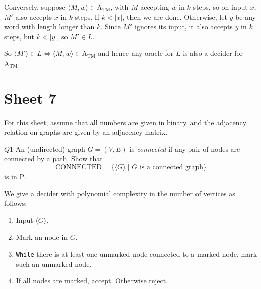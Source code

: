 \documentclass{article}
\theoremstyle{definition}
\theoremstyle{definition}
\theoremstyle{remark}
\begin{document}
Conversely, suppose $\langle M,w\rangle\in\text{A}_\text{TM}$, with $M$ accepting $w$ in $k$ steps, so on input $x$, $M'$ also accepts $x$ in $k$ steps. If $k<|x|$, then we are done. Otherwise, let $y$ be any word with length longer than $k$. Since $M'$ ignores its input, it also accepts $y$ in $k$ steps, but $k<|y|$, so $M'\in L$.

So $\langle M'\rangle\in L\Longleftrightarrow\langle M,w\rangle\in\text{A}_\text{TM}$ and hence any oracle for $L$ is also a decider for $\text{A}_\text{TM}$.





















\newpage

\section{Sheet 7}

For this sheet, assume that all numbers are given in binary, and the adjacency relation on graphs are given by an adjacency matrix.

\begin{questionbox}{$Q1$}
    An (undirected) graph $G=(V,E)$ is \textit{connected} if any pair of nodes are connected by a path. Show that
    \begin{equation*}
        \text{CONNECTED}=\bigl\{\langle G\rangle\mid G\text{ is a connected graph}\bigr\}
    \end{equation*}
    is in $\mathrm{P}$.
\end{questionbox}

\bigskip

We give a decider with polynomial complexity in the number of vertices as follows:

\begin{enumerate}
    \item[$(1)$] Input $\langle G\rangle$.
    
    \item[$(2)$] Mark an node in $G$.

    \item[$(3)$] \texttt{While} there is at least one unmarked node connected to a marked node, mark such an unmarked node.

    \item[$(4)$] If all nodes are marked, accept. Otherwise reject.
\end{enumerate}
\end{document}
